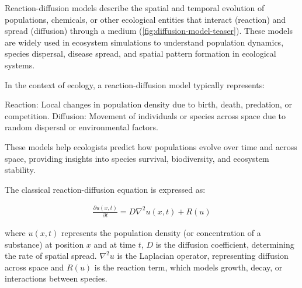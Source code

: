 

Reaction-diffusion models describe the spatial and temporal evolution of populations, chemicals, or other ecological entities that interact (reaction) and spread (diffusion) through a medium (\cref{fig:diffusion-model-teaser}). These models are widely used in ecosystem simulations to understand population dynamics, species dispersal, disease spread, and spatial pattern formation in ecological systems.

In the context of ecology, a reaction-diffusion model typically represents:
\begin{Itemize}
    \Item{} Reaction: Local changes in population density due to birth, death, predation, or competition.
    \Item{} Diffusion: Movement of individuals or species across space due to random dispersal or environmental factors.
\end{Itemize}
These models help ecologists predict how populations evolve over time and across space, providing insights into species survival, biodiversity, and ecosystem stability.

The classical reaction-diffusion equation is expressed as:

\begin{align}
    \label{eq:env-obj-classic-reaction-diffusion}
    \frac{\partial u (x, t)}{\partial t} = D \nabla^2 u(x, t) + R(u)
\end{align}

where $u(x,t)$ represents the population density (or concentration of a substance) at position $x$ and at time $t$, $D$ is the diffusion coefficient, determining the rate of spatial spread. $\nabla^2 u$ is the Laplacian operator, representing diffusion across space and $R(u)$ is the reaction term, which models growth, decay, or interactions between species.


